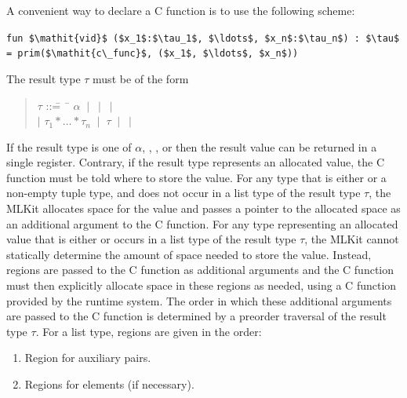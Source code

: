 \documentclass[12pt]{book}
\begin{document}
A convenient way to declare a C function is to use the following scheme:
\begin{center}
  \lstinline!fun $\mathit{vid}$ ($x_1$:$\tau_1$, $\ldots$, $x_n$:$\tau_n$) : $\tau$ = prim($\mathit{c\_func}$, ($x_1$, $\ldots$, $x_n$))!
\end{center}

\noindent
The result type $\tau$ must be of the form
\begin{quote}
\begin{tabbing}
$\tau$ ::\== ~\= $\alpha$ $~|~$  $~|~$  $~|~$  \\
  \> $|$ \> $\tau_1 \ast \ldots \ast \tau_n$ $~|~$ $\tau$  $~|~$  $~|~$ 
\end{tabbing}
\end{quote}
\noindent
If the result type is one of $\alpha$, , , or  then
the result value can be returned in a single register. Contrary, if the result
type represents an allocated value, the C function must be told where to store
the value. For any type that is either  or a non-empty tuple type, and
does not occur in a list type of the result type $\tau$, the MLKit allocates
space for the value and passes a pointer to the allocated space as an additional
argument to the C function. For any type representing an allocated value that is
either  or occurs in a list type of the result type $\tau$, the MLKit
cannot statically determine the amount of space needed to store the
value. Instead, regions are passed to the C function as additional arguments and
the C function must then explicitly allocate space in these regions as needed,
using a C function provided by the runtime system. The order in which these
additional arguments are passed to the C function is determined by a preorder
traversal of the result type $\tau$.  For a list type, regions are given in the
order:
\begin{enumerate}
\item Region for auxiliary pairs.
\item Regions for elements (if necessary).
\end{enumerate}
\end{document}

